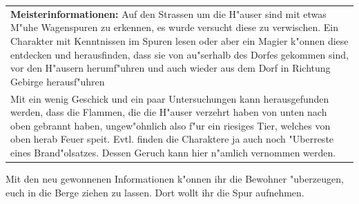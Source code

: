 \begin{longtable}{|p{15cm}|}
\hline
\textbf{Meisterinformationen:}
Auf den Strassen um die H"auser sind mit etwas M"uhe Wagenspuren zu erkennen, es wurde versucht diese zu verwischen. Ein Charakter mit Kenntnissen im Spuren lesen oder aber ein Magier k"onnen diese entdecken und herausfinden, dass sie von au"serhalb des Dorfes gekommen sind, vor den H"ausern herumf"uhren und auch wieder aus dem Dorf in Richtung Gebirge herausf"uhren\\
Mit ein wenig Geschick und ein paar Untersuchungen kann herausgefunden werden, dass die Flammen, die die H"auser verzehrt haben von unten nach oben gebrannt haben, ungew"ohnlich also f"ur ein riesiges Tier, welches von oben herab Feuer speit. Evtl. finden die Charaktere ja auch noch "Uberreste eines Brand"olsatzes. Dessen Geruch kann hier n"amlich vernommen werden.\\
\hline
\end{longtable}

\par Mit den neu gewonnenen Informationen k"onnen ihr die Bewohner "uberzeugen, euch in die Berge ziehen zu lassen. Dort wollt ihr die Spur aufnehmen.
